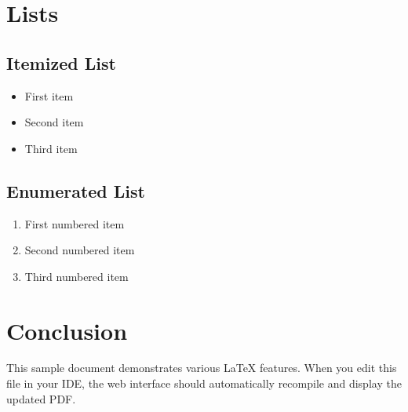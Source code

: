 \documentclass{article}
\begin{document}
\section{Lists}

\subsection{Itemized List}
\begin{itemize}
    \item First item
    \item Second item
    \item Third item
\end{itemize}

\subsection{Enumerated List}
\begin{enumerate}
    \item First numbered item
    \item Second numbered item
    \item Third numbered item
\end{enumerate}

\section{Conclusion}

This sample document demonstrates various LaTeX features. When you edit this file in your IDE, the web interface should automatically recompile and display the updated PDF.
\end{document}

